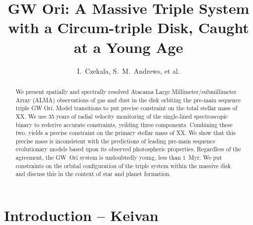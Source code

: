 \documentclass[twocolumn]{aastex6}
\begin{document}
\title{GW Ori: A Massive Triple System with a Circum-triple Disk, Caught at a Young Age}
\author{I.~Czekala, S.~M.~Andrews, et al.} %

\begin{abstract}
We present spatially and spectrally resolved Atacama Large Millimeter/submillimeter Array (ALMA) observations of gas and dust in the disk orbiting the pre-main sequence triple GW Ori. Model transitions to put precise constraint on the total stellar mass of XX. We use 35 years of radial velocity monitoring of the single-lined spectroscopic binary to rederive accurate constraints, yeilding three components. Combining these two, yields a precise constraint on the primary stellar mass of XX. We show that this precise mass is inconsistent with the predictions of leading pre-main sequence evolutionary models based upon its observed photospheric properties. Regardless of the agreement, the GW~Ori system is undoubtedly young, less than 1~Myr. We put constraints on the orbital configuration of the triple system within the massive disk and discuss this in the context of star and planet formation.
\end{abstract}


\section{Introduction -- \textbf{Keivan} \label{sec:intro}}
\end{document}
